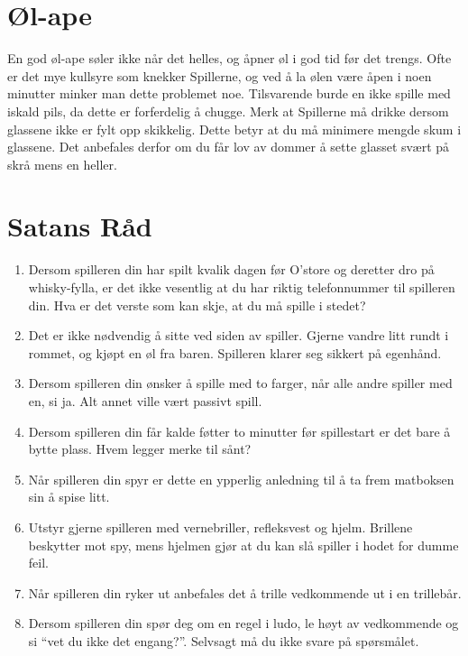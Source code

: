 \documentclass[10pt,a4paper,norsk,openany]{book}
\begin{document}
\section{Øl-ape}
\label{sec:ol-ape}

En god øl-ape søler ikke når det helles, og åpner øl i god tid før det trengs.
Ofte er det mye kullsyre som knekker Spillerne, og ved å la ølen være åpen i
noen minutter minker man dette problemet noe. Tilsvarende burde en ikke spille
med iskald pils, da dette er forferdelig å chugge. Merk at Spillerne må drikke
dersom glassene ikke er fylt opp skikkelig. Dette betyr at du må minimere
mengde skum i glassene. Det anbefales derfor om du får lov av dommer å sette
glasset svært på skrå mens en heller. 


\section{Satans Råd}

\begin{enumerate}
  \item Dersom spilleren din har spilt kvalik dagen før O'store og deretter
    dro på whisky-fylla, er det ikke
    vesentlig at du har riktig telefonnummer til spilleren din. Hva er det
    verste som kan skje, at du må spille i stedet?
    
  \item Det er ikke nødvendig å sitte ved siden av spiller. Gjerne vandre litt
    rundt i rommet, og kjøpt en øl fra baren. Spilleren klarer seg sikkert på egenhånd.
    
  \item Dersom spilleren din ønsker å spille med to farger, når alle andre
    spiller med en, si ja. Alt annet ville vært passivt spill.

  \item Dersom spilleren din får kalde føtter to minutter før spillestart er det
    bare å bytte plass. Hvem legger merke til sånt?

  \item Når spilleren din spyr er dette en ypperlig anledning til å ta frem
    matboksen sin å spise litt.

  \item Utstyr gjerne spilleren med vernebriller, refleksvest og hjelm. Brillene
    beskytter mot spy, mens hjelmen gjør at du kan slå spiller i hodet for dumme
    feil.

  \item Når spilleren din ryker ut anbefales det å trille vedkommende ut i en
    trillebår.

  \item Dersom spilleren din spør deg om en regel i ludo, le høyt av vedkommende
    og si ``vet du ikke det engang?''. Selvsagt må du ikke svare på spørsmålet.
\end{enumerate}
\end{document}
